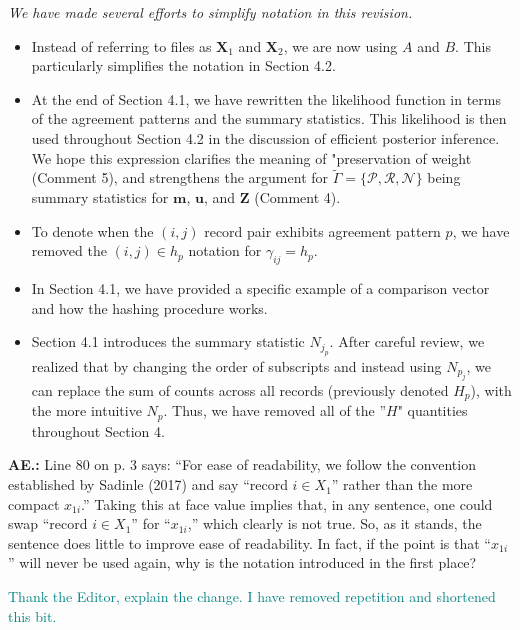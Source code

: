 \documentclass[letterpaper, parskip]{scrartcl}
\newcommand{\pointRaised}[2]{%
	\textbf{#1.\theresponsectr:} #2
}
\newcounter{responsectr}[section]     %
\newcommand{\reply}[1]{%
	\refstepcounter{responsectr}%
		\begin{tcolorbox}
			\itshape #1
		\end{tcolorbox}
}
\begin{document}
\reply{We have made several efforts to simplify notation in this revision.

\begin{itemize}
	\item Instead of referring to files as $\mathbf{X}_1$ and $\mathbf{X}_2$, we are now using $A$ and $B$. This particularly simplifies the notation in Section 4.2.
	
	\item At the end of Section 4.1, we have rewritten the likelihood function in terms of the agreement patterns and the summary statistics.
	This likelihood is then used throughout Section 4.2 in the discussion of efficient posterior inference. We hope this expression clarifies the meaning of "preservation of weight (Comment 5), and strengthens the argument for $\tilde{\Gamma} = \{\mathcal{P}, \mathcal{R}, \mathcal{N} \}$ being summary statistics for $\bm{m}$, $\bm{u}$, and $\bm{Z}$ (Comment 4). 
	
	\item To denote when the $(i,j)$ record pair exhibits agreement pattern $p$, we have removed the $(i, j) \in h_p$ notation for $\gamma_{ij} = h_p$.
	
	\item In Section 4.1, we have provided a specific example of a comparison vector and how the hashing procedure works. 
	
	\item Section 4.1 introduces the summary statistic $N_{j_p}$. After careful review, we realized that by changing the order of subscripts and instead using $N_{p_j}$, we can replace the sum of counts across all records (previously denoted $H_p$), with the more intuitive $N_p$. Thus, we have removed all of the ''$H$" quantities throughout Section 4. 
\end{itemize}
}

\pointRaised{AE}{Line 80 on p. 3 says: “For ease of readability, we follow the convention established by Sadinle (2017) and say “record $i \in X_1$” rather than the more compact $x_{1i}$.” Taking this at face value implies that, in any sentence, one could swap “record $i \in X_1$” for “$x_{1i}$,” which clearly is not true.  So, as it stands, the sentence does little to improve ease of readability.  In fact, if the point is that “$x_{1i}$” will never be used again, why is the notation introduced in the first place?}

\textcolor{teal}{Thank the Editor, explain the change. I have removed repetition and shortened this bit.}
\end{document}
